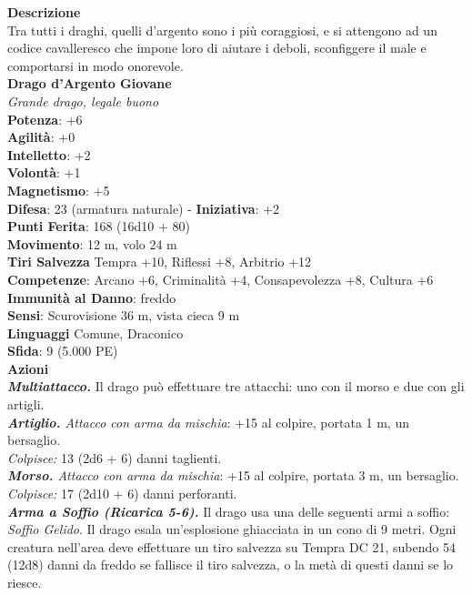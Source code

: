 \begin{multicols}{2}
\textbf{Descrizione}\\
Tra tutti i draghi, quelli d’argento sono i più coraggiosi, e si attengono ad un codice cavalleresco che impone loro di aiutare i deboli, sconfiggere il male e comportarsi in modo onorevole.\\
\medskip\textbf{Drago d'Argento Giovane}\\
\emph{Grande drago, legale buono}\\
\textbf{Potenza}: +6\\
\textbf{Agilità}: +0\\
\textbf{Intelletto}: +2\\
\textbf{Volontà}: +1\\
\textbf{Magnetismo}: +5\\
\textbf{Difesa}: 23 (armatura naturale) - \textbf{Iniziativa}: +2\\
\textbf{Punti Ferita}: 168 (16d10 + 80)\\
\textbf{Movimento}: 12 m, volo 24 m\\
\textbf{Tiri Salvezza} Tempra +10, Riflessi +8, Arbitrio +12\\
\textbf{Competenze}: Arcano +6, Criminalità +4, Consapevolezza +8, Cultura +6\\
\textbf{Immunità al Danno}: freddo\\
\textbf{Sensi}: Scurovisione 36 m, vista cieca 9 m\\
\textbf{Linguaggi} Comune, Draconico\\
\textbf{Sfida}: 9 (5.000 PE)\smallskip\\
\smallskip\textbf{Azioni}\\
\emph{\textbf{Multiattacco.}} Il drago può effettuare tre attacchi: uno con il morso e due con gli artigli.\\
\emph{\textbf{Artiglio.} Attacco con arma da mischia}: +15 al colpire, portata 1 m, un bersaglio.\\
\emph{Colpisce:} 13 (2d6 + 6) danni taglienti.\\
\emph{\textbf{Morso.} Attacco con arma da mischia}: +15 al colpire, portata 3 m, un bersaglio.\\
\emph{Colpisce:} 17 (2d10 + 6) danni perforanti.\\
\emph{\textbf{Arma a Soffio (Ricarica 5-6).}} Il drago usa una delle seguenti armi a soffio:\\
\emph{Soffio Gelido}. Il drago esala un'esplosione ghiacciata in un cono di 9 metri. Ogni creatura nell'area deve effettuare un tiro salvezza su Tempra DC  21, subendo 54 (12d8) danni da freddo se fallisce il tiro salvezza, o la metà di questi danni se lo riesce.\\

\end{multicols}
